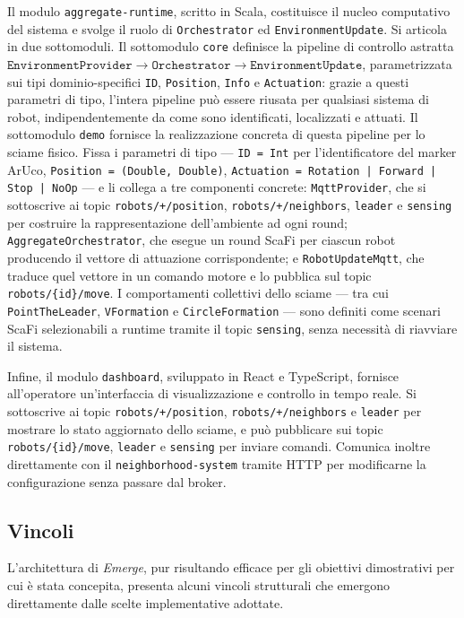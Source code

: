 Il modulo \texttt{aggregate-runtime}, scritto in Scala, costituisce il nucleo
computativo del sistema e svolge il ruolo di \texttt{Orchestrator} ed
\texttt{EnvironmentUpdate}. Si articola in due sottomoduli. Il sottomodulo
\texttt{core} definisce la pipeline di controllo astratta
$\texttt{EnvironmentProvider} \to \texttt{Orchestrator} \to
    \texttt{EnvironmentUpdate}$, parametrizzata sui tipi dominio-specifici
\texttt{ID}, \texttt{Position}, \texttt{Info} e \texttt{Actuation}: grazie a
questi parametri di tipo, l'intera pipeline può essere riusata per qualsiasi
sistema di robot, indipendentemente da come sono identificati, localizzati e
attuati. Il sottomodulo \texttt{demo} fornisce la realizzazione concreta di
questa pipeline per lo sciame fisico. Fissa i parametri di tipo ---
\texttt{ID = Int} per l'identificatore del marker ArUco,
\texttt{Position = (Double, Double)},
\texttt{Actuation = Rotation | Forward | Stop | NoOp} --- e li collega a tre
componenti concrete: \texttt{MqttProvider}, che si sottoscrive ai topic
\texttt{robots/+/position}, \texttt{robots/+/neighbors}, \texttt{leader} e
\texttt{sensing} per costruire la rappresentazione dell'ambiente ad ogni round;
\texttt{AggregateOrchestrator}, che esegue un round ScaFi per ciascun robot
producendo il vettore di attuazione corrispondente; e \texttt{RobotUpdateMqtt},
che traduce quel vettore in un comando motore e lo pubblica sul topic
\texttt{robots/\{id\}/move}. I comportamenti collettivi dello sciame ---
tra cui \texttt{PointTheLeader}, \texttt{VFormation} e \texttt{CircleFormation}
--- sono definiti come scenari ScaFi selezionabili a runtime tramite il topic
\texttt{sensing}, senza necessità di riavviare il sistema.

Infine, il modulo \texttt{dashboard}, sviluppato in React e TypeScript, fornisce
all'operatore un'interfaccia di visualizzazione e controllo in tempo reale. Si
sottoscrive ai topic \texttt{robots/+/position}, \texttt{robots/+/neighbors} e
\texttt{leader} per mostrare lo stato aggiornato dello sciame, e può pubblicare
sui topic \texttt{robots/\{id\}/move}, \texttt{leader} e \texttt{sensing} per
inviare comandi. Comunica inoltre direttamente con il
\texttt{neighborhood-system} tramite HTTP per modificarne la configurazione senza
passare dal broker.
%
\subsection{Vincoli}
\label{subsec:vincoli}
%
L'architettura di \textit{Emerge}, pur risultando efficace per gli obiettivi
dimostrativi per cui è stata concepita, presenta alcuni vincoli strutturali che
emergono direttamente dalle scelte implementative adottate.

